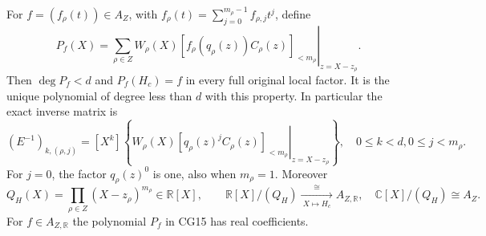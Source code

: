 \begin{theorem}\label{cg:inverse-thm}
For $f=(f_\rho(t))\in A_Z$, with
$f_\rho(t)=\sum_{j=0}^{m_\rho-1}f_{\rho,j}t^j$, define
\begin{equation}
 P_f(X)=\sum_{\rho\in Z}W_\rho(X)
    \left.
      \left[f_\rho(q_\rho(z))C_\rho(z)\right]_{<m_\rho}
    \right|_{z=X-z_\rho}.
 \tag{CG15}\label{cg:inverse}
\end{equation}
Then $\deg P_f<d$ and $P_f(H_c)=f$ in every full original local
factor. It is the unique polynomial of degree less than $d$ with
this property. In particular the exact inverse matrix is
\begin{equation}
 (E^{-1})_{k,(\rho,j)}=[X^k]\left\{
 W_\rho(X)
 \left.\left[q_\rho(z)^jC_\rho(z)\right]_{<m_\rho}
                                  \right|_{z=X-z_\rho}\right\},
 \quad 0\le k<d, 0\le j<m_\rho.
 \tag{CG16}\label{cg:inverse-matrix}
\end{equation}
For $j=0$, the factor $q_\rho(z)^0$ is one, also when $m_\rho=1$.
Moreover
\begin{equation}
 Q_H(X)=\prod_{\rho\in Z}(X-z_\rho)^{m_\rho}\in\mathbb{R}[X],\qquad
 \mathbb{R}[X]/(Q_H)\xrightarrow[\ X\mapsto H_c\ ]{\ \cong\ }A_{Z,\mathbb{R}},
 \quad
 \mathbb{C}[X]/(Q_H)\cong A_Z.
 \tag{CG17}\label{cg:real-generator}
\end{equation}
For $f\in A_{Z,\mathbb{R}}$ the polynomial $P_f$ in CG15 has real
coefficients.
\end{theorem}

